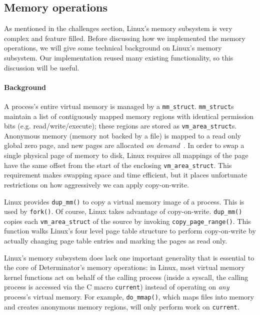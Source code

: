 \begin{itemize}
\subsection{Memory operations}

As mentioned in the challenges section, Linux's memory subsystem is very complex
and feature filled. Before discussing how we implemented the memory operations,
we will give some technical background on Linux's memory subsystem. Our
implementation reused many existing functionality, so this discussion will be
useful.

\paragraph{Background}
A process's entire virtual memory is managed by a {\tt mm\_struct}.
{\tt mm\_struct}s maintain a list of contiguously mapped memory regions with
identical permission bits (e.g. read/write/execute); these regions are stored as
{\tt vm\_area\_struct}s. Anonymous memory (memory
not backed by a file) is mapped to a read only global zero page, and new pages
are allocated \emph{on demand}~\cite{li1989memory}. In order to swap a single
physical page of memory to disk, Linux requires all mappings of the page have
the same offset from the start of the enclosing {\tt vm\_area\_struct}. This
requirement makes swapping space and time efficient, but it places unfortunate
restrictions on how aggressively we can apply copy-on-write.

Linux provides {\tt dup\_mm()} to copy a virtual memory image of a process. This
is used by {\tt fork()}. Of course, Linux takes advantage of copy-on-write.
{\tt dup\_mm()} copies each {\tt vm\_area\_struct} of the source by invoking
{\tt copy\_page\_range()}. This function walks Linux's four level
page table structure to perform copy-on-write by actually changing page table
entries and marking the pages as read only.

Linux's memory subsystem does lack one important generality that is essential to
the core of Determinator's memory operations: in Linux, most virtual memory
kernel functions act on behalf
of the calling process (inside a syscall, the calling process is accessed via
the C macro {\tt current}) instead of operating on \emph{any} process's
virtual memory. For example, {\tt do\_mmap()}, which maps files into memory and
creates anonymous memory regions, will only perform work on {\tt current}.


\end{itemize}
